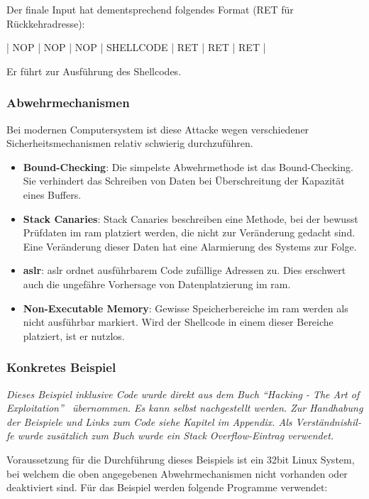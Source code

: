 \documentclass[11pt, a4paper]{article}
\begin{document}
Der finale Input hat dementsprechend folgendes Format (RET für Rückkehradresse):
\newline
\begin{center}
	\centerline{| NOP | NOP | NOP | SHELLCODE | RET | RET | RET |}
\end{center}
Er führt zur Ausführung des Shellcodes.

\subsubsection{Abwehrmechanismen}\label{subsubsec:abwehrbuffer-overflow}
Bei modernen Computersystem ist diese Attacke wegen verschiedener Sicherheitsmechanismen relativ schwierig durchzuführen.

\begin{itemize}
	\item \textbf{Bound-Checking}: Die simpelste Abwehrmethode ist das Bound-Checking. Sie verhindert das Schreiben von Daten bei Überschreitung der Kapazität eines Buffers.
	\item \textbf{Stack Canaries}: Stack Canaries beschreiben eine Methode, bei der bewusst Prüfdaten im \gls{ram} platziert werden, die nicht zur Veränderung gedacht sind. Eine Veränderung dieser Daten hat eine Alarmierung des Systems zur Folge.~\cite{StackCan84:online}
	\item \textbf{\gls{aslr}}: \gls{aslr} ordnet ausführbarem Code zufällige Adressen zu. Dies erschwert auch die ungefähre Vorhersage von Datenplatzierung im \gls{ram}.~\cite{Whatisad68:online}
	\item \textbf{Non-Executable Memory}: Gewisse Speicherbereiche im \gls{ram} werden als nicht ausführbar markiert. Wird der Shellcode in einem dieser Bereiche platziert, ist er nutzlos.
\end{itemize}


\subsubsection{Konkretes Beispiel}\label{subsubsec:bspbuffer-overflow}
\textit{Dieses Beispiel inklusive Code wurde direkt aus dem Buch ``Hacking - The Art of Exploitation''~\cite{erickson2008hacking} übernommen. Es kann selbst nachgestellt werden. Zur Handhabung der Beispiele und Links zum Code siehe Kapitel  im Appendix. Als Ver­ständ­nis­hil­fe wurde zusätzlich zum Buch wurde ein Stack Overflow-Eintrag verwendet.~\cite{stacko:online}}

Voraussetzung für die Durchführung dieses Beispiels ist ein 32bit Linux System, bei welchem die oben angegebenen Abwehrmechanismen nicht vorhanden oder deaktiviert sind. Für das Beispiel werden folgende Programme verwendet:
\end{document}
